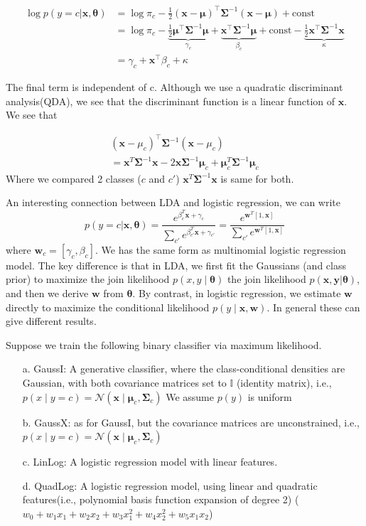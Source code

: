\documentclass[10pt,landscape]{article}
\newcommand{\N}{\mathcal{N}}
\newcommand{\indicator}{\mathbb{I}}
\newcommand{\inp}{\textbf{x}}
\newcommand{\out}{\textbf{y}}
\newcommand{\parameter}{\boldsymbol{\theta}}
\newcommand{\Cov}{\mathbf{\Sigma}}
\newcommand{\Mean}{\boldsymbol{\mu}}
\newcommand{\Weight}{\mathbf{w}}
\begin{document}
\begin{multicols*}{3}
\begin{align*}
    \log p(y = c | \inp, \parameter) &= \log \pi_c - \frac{1}{2} (\inp - \Mean)^\top \Cov^{-1} (\inp - \Mean) + \text{const}  \\
    &= \log \pi_c - \underbrace{\frac{1}{2} \Mean^\top \Cov^{-1} \Mean}_{\gamma_c} + \underbrace{\inp^\top \Cov^{-1} \Mean}_{\beta_c} + \text{const} - \underbrace{\frac{1}{2} \inp^\top \Cov^{-1} \inp}_{\kappa} \\
    &= \gamma_c + \inp^\top \beta_c + \kappa 
\end{align*}

The final term is independent of c. Although we use a quadratic discriminant analysis(QDA), we see that the discriminant function is a linear function of $\inp$. We see that 

\begin{align*}
    (\inp - \mu_c)^{\top} \Cov^{-1} (\inp - \mu_c) \\
    = \inp^T\Cov^{-1} \inp- 2 \inp\Cov^{-1}\Mean_c+\Mean_c^T\Cov^{-1}\Mean_c
\end{align*}
Where we compared 2 classes ($c$ and $c'$) $\inp^T\Cov^{-1} \inp$ is same for both. 

An interesting connection between LDA and logistic regression, we can write
\[
p(y=c|\inp,\parameter)=\frac{e^{\beta_c^T\inp+\gamma_c}}{\sum_{c'}e^{\beta_{c'}^T\inp+\gamma_{c'}}}=\frac{e^{\Weight^T[1,\inp]}}{\sum_{c'}e^{\Weight^T[1,\inp]}}
\]
where $\Weight_c=[\gamma_c,\beta_c]$. We has the same form as multinomial logistic regression model. The key difference is that in LDA, we first fit the Gaussians (and class prior) to maximize the join likelihood $p(x,y\mid\parameter)$ the join likelihood $p(\inp,\out|\parameter)$, and then we derive $\Weight$ from $\parameter$. By contrast, in logistic regression, we estimate $\Weight$ directly to maximize the conditional likelihood $p(y\mid\inp,\Weight)$. In general these can give different results. 

Suppose we train the following binary classifier via maximum likelihood.
\begin{itemize}
    \item[a.] GaussI: A generative classifier, where the class-conditional densities are Gaussian, with both covariance matrices set to $\indicator$ (identity matrix), i.e., $p(x\mid y=c)=\N(\inp\mid\Mean_c,\Cov_c)$ We assume $p(y)$ is uniform
    \item[b.] GaussX: as for GaussI, but the covariance matrices are unconstrained, i.e., $p(x\mid y=c)=\N(\inp\mid\Mean_c,\Cov_c)$
    \item[c.] LinLog: A logistic regression model with linear features.
    \item[d.] QuadLog: A logistic regression model, using linear and quadratic features(i.e., polynomial basis function expansion of degree 2) (\(w_0+w_1x_1+w_2x_2+w_3x_1^2+w_4x_2^2+w_5x_1x_2\)) 
\end{itemize}


\end{multicols*}
\end{document}
